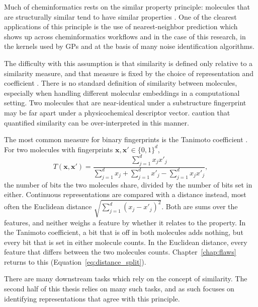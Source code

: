 Much of cheminformatics rests on the similar property principle: molecules that are structurally similar tend to have similar properties \citep{Johnson1990, vanTilborg2022}. 
One of the clearest applications of this principle is the use of nearest-neighbor prediction which shows up across cheminformatics workflows and in the case of this research, in the kernels used by GPs and at the basis of many noise identification algorithms.

The difficulty with this assumption is that similarity is defined only relative to a similarity measure, and that measure is fixed by the choice of representation and
coefficient \citep{Maggiora2014}. There is no standard definition of similarity between molecules, especially when handling different molecular embeddings in a computational setting. Two molecules that are near-identical under a substructure fingerprint may be far apart under a physicochemical descriptor vector. \citet{Maggiora2014} caution that quantified similarity can be over-interpreted in this manner.

The most common measure for binary fingerprints is the Tanimoto coefficient \citep{Bajusz2015}. For two molecules with fingerprints $\mathbf{x}, \mathbf{x}' \in \{0,1\}^d$,
\begin{equation}
T(\mathbf{x}, \mathbf{x}') = \frac{\sum_{j=1}^{d} x_j x'_j}{\sum_{j=1}^{d} x_j + \sum_{j=1}^{d} x'_j - \sum_{j=1}^{d} x_j x'_j},
\label{eq:tanimoto}
\end{equation}
the number of bits the two molecules share, divided by the number of bits set in either. Continuous representations are compared with a distance instead, most often the Euclidean distance $\sqrt{\sum_{j=1}^{d}(x_j - x'_j)^2}$. Both are sums over the features, and neither weighs a feature by whether it relates to the property. In the Tanimoto coefficient, a bit that is off in both molecules adds nothing, but every bit that is set in either molecule counts. In the Euclidean distance, every feature that differs between the two molecules counts. Chapter~\ref{chap:flaws} returns to this (Equation~\ref{eq:distance_split}). 

There are many downstream tasks which rely on the concept of similarity. The second half of this thesis relies on many such tasks, and as such focuses on identifying representations that agree with this principle. 


